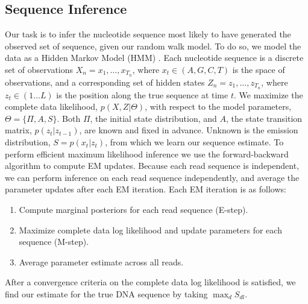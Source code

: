 \documentclass[12pt]{article}
\begin{document}
\subsection{Sequence Inference}
Our task is to infer the nucleotide sequence most likely to have generated the observed set of sequence, given our random walk model.
To do so, we model the data as a Hidden Markov Model (HMM) \cite{Rabiner1989}.
Each nucleotide sequence is a discrete set of observations $X_n = x_1,\ldots,x_{T_n}$, where $x_t \in (A,G,C,T)$ is the space of observations, and a corresponding set of hidden states $Z_n = z_1,\ldots,z_{T_n}$, where $z_t \in (1\ldots L)$ is the position along the true sequence at time $t$.
We maximize the complete data likelihood, $p(X,Z|\Theta)$, with respect to the model parameters, $\Theta=\{\Pi,A,S\}$.
Both $\Pi$, the initial state distribution, and $A$, the state transition matrix, $p(z_t|z_{t-1})$, are known and fixed in advance.
Unknown is the emission distribution, $S = p(x_t|z_t)$, from which we learn our sequence estimate.
To perform efficient maximum likelihood inference we use the forward-backward algorithm to compute EM updates.
Because each read sequence is independent, we can perform inference on each read sequence independently, and average the parameter updates after each EM iteration.
Each EM iteration is as follows:

\begin{enumerate}
\item Compute marginal posteriors for each read sequence (E-step).
\item Maximize complete data log likelihood and update parameters for each sequence (M-step).
\item Average parameter estimate across all reads.
\end{enumerate}

After a convergence criteria on the complete data log likelihood is satisfied, we find our estimate for the true DNA sequence by taking $\max_d S_{dl}$.

\end{document}

